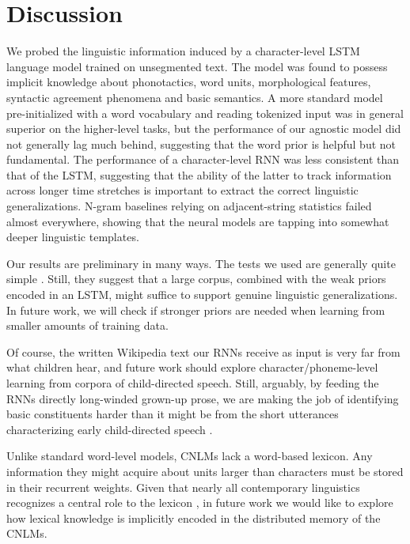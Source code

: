 \section{Discussion}
\label{sec:discussion}

We probed the linguistic information induced by a character-level LSTM
language model trained on unsegmented text. The model was found to
possess implicit knowledge about phonotactics, word units,
morphological features, syntactic agreement phenomena and basic
semantics. A more standard model pre-initialized with a word
vocabulary and reading tokenized input was in general superior on the
higher-level tasks, but the performance of our agnostic model did not
generally lag much behind, suggesting that the word prior is helpful
but not fundamental. The performance of a character-level RNN was less
consistent than that of the LSTM, suggesting that the ability of the
latter to track information across longer time stretches is important
to extract the correct linguistic generalizations. N-gram baselines
relying on adjacent-string statistics failed almost everywhere,
showing that the neural models are tapping into somewhat deeper
linguistic templates.

Our results are preliminary in many ways. The tests we used are
generally quite simple \cite[we did not attempt, for example, to model
long-distance agreement in presence of distractors, a
challenging task even for word-based models and
humans:][]{Gulordava:etal:2018}. Still, they  suggest that a large
corpus, combined with the weak priors encoded in an LSTM, might
suffice to support genuine linguistic generalizations. In future work,
we will check if stronger priors are needed when learning
from smaller amounts of training data.

Of course, the written Wikipedia text our RNNs receive as input is
very far from what children hear, and future work should explore
character/phoneme-level learning from corpora of child-directed
speech. Still, arguably, by feeding the RNNs directly long-winded
grown-up prose, we are making the job of identifying basic
constituents harder than it might be from the short utterances
characterizing early child-directed speech \cite{Tomasello:2003}.

Unlike standard word-level models, CNLMs lack a word-based
lexicon. Any information they might acquire about units larger than
characters must be stored in their recurrent weights. Given that
nearly all contemporary linguistics recognizes a central role to the
lexicon \cite[see,
e.g.,][]{Sag:etal:2003,Goldberg:2005,Radford:2006,Bresnan:etal:2016,Jezek:2016},
in future work we would like to explore how lexical knowledge is
implicitly encoded in the distributed memory of the CNLMs.

